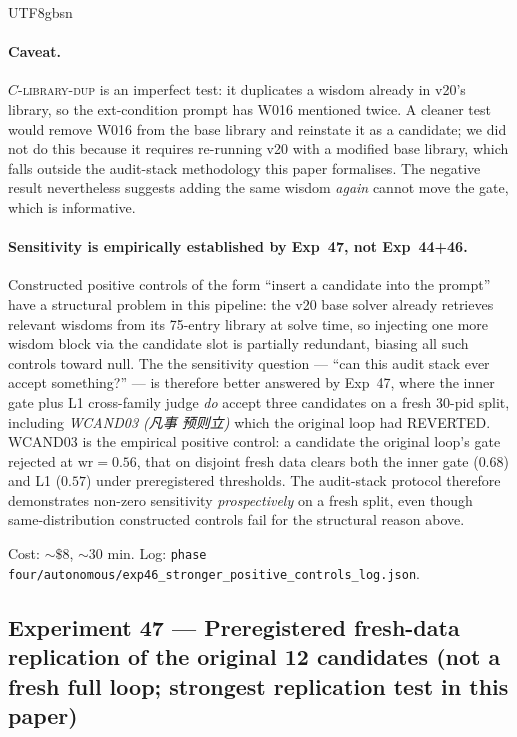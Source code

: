 \documentclass{article}
\begin{document}
\begin{CJK*}{UTF8}{gbsn}
\paragraph{Caveat.} \(C\)-\textsc{library-dup} is an imperfect
test: it duplicates a wisdom already in v20's library, so the
ext-condition prompt has W016 mentioned twice. A cleaner test
would remove W016 from the base library and reinstate it as a
candidate; we did not do this because it requires re-running v20
with a modified base library, which falls outside the audit-stack
methodology this paper formalises. The negative result
nevertheless suggests adding the same wisdom \emph{again} cannot
move the gate, which is informative.

\paragraph{Sensitivity is empirically established by Exp~47, not
Exp~44+46.} Constructed positive controls of the form ``insert a
candidate into the prompt'' have a structural problem in this
pipeline: the v20 base solver already retrieves relevant wisdoms
from its 75-entry library at solve time, so injecting one more
wisdom block via the candidate slot is partially redundant,
biasing all such controls toward null. The the
sensitivity question --- ``can this audit stack ever accept
something?'' --- is therefore better answered by Exp~47, where the
inner gate plus L1 cross-family judge \emph{do} accept three
candidates on a fresh 30-pid split, including \emph{WCAND03 (凡事
预则立)} which the original loop had REVERTED. WCAND03 is the
empirical positive control: a candidate the original loop's gate
rejected at \(\mathrm{wr} = 0.56\), that on disjoint fresh data
clears both the inner gate (\(0.68\)) and L1 (\(0.57\)) under
preregistered thresholds. The audit-stack protocol therefore
demonstrates non-zero sensitivity \emph{prospectively} on a fresh
split, even though same-distribution constructed controls fail
for the structural reason above.

Cost: \({\sim}\$8\), \({\sim}30\) min. Log:
\texttt{phase four/autonomous/exp46\_stronger\_positive\_controls\_log.json}.

\subsection{Experiment 47 --- Preregistered fresh-data replication
of the original 12 candidates (not a fresh full loop;
strongest replication test in this paper)}
\label{sec:exp47}


\end{CJK*}
\end{document}
